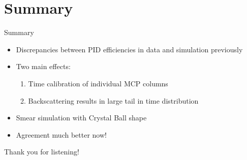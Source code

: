 \documentclass{beamer}
\begin{document}
\section{Summary}
\begin{frame}{Summary}
  \begin{itemize}
  \setlength\itemsep{1.0em}
    \item{Discrepancies between PID efficiencies in data and simulation previously}
    \item{Two main effects:}
    \begin{enumerate}
      \item{Time calibration of individual MCP columns}
      \item{Backscattering results in large tail in time distribution}
    \end{enumerate}
    \item{Smear simulation with Crystal Ball shape}
    \item{Agreement much better now!}
  \end{itemize}
  \begin{center}
    \Huge Thank you for listening!
  \end{center}
\end{frame}
\end{document}
